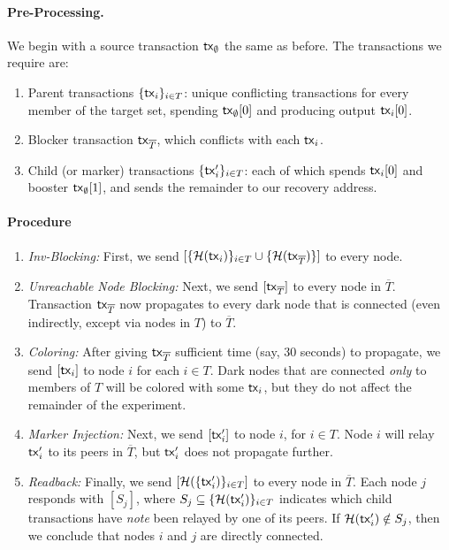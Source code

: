\paragraph{Pre-Processing.}
We begin with a source transaction $\textnormal{\textsf{tx}}_\emptyset$ the same as before. The transactions we require are:
\begin{enumerate}
\item Parent transactions $\{\textnormal{\textsf{tx}}_{i}\}_{i \in T}$: unique conflicting transactions for every member of the target set, spending $\textnormal{\textsf{tx}}_\emptyset[0]$ and producing output $\textnormal{\textsf{tx}}_i[0]$.
\item Blocker transaction $\textnormal{\textsf{tx}}_{\overline{T}}$, which conflicts with each $\textnormal{\textsf{tx}}_{i}$.
\item Child (or marker) transactions $\{\textnormal{\textsf{tx}}'_i\}_{i \in T}$: each of which spends $\textnormal{\textsf{tx}}_i[0]$ and booster $\textnormal{\textsf{tx}}_\emptyset[1]$, and sends the remainder to our recovery address.
\end{enumerate}

\paragraph{Procedure}
\begin{enumerate}
\item \emph{Inv-Blocking:} First, we send $[\{\mathcal{H}(\textnormal{\textsf{tx}}_i)\}_{i \in T} \cup \{\mathcal{H}(\textnormal{\textsf{tx}}_{\overline{T}})\}]$ to every node.
\item \emph{Unreachable Node Blocking:} Next, we send $[\textnormal{\textsf{tx}}_{\overline{T}}]$ to every node in $\overline{T}$. Transaction $\textnormal{\textsf{tx}}_{\overline{T}}$ now propagates to every dark node that is connected (even indirectly, except via nodes in $T$) to $\overline{T}$.
\item \emph{Coloring:} After giving $\textnormal{\textsf{tx}}_{\overline{T}}$ sufficient time (say, 30 seconds) to propagate, we send $[\textnormal{\textsf{tx}}_i]$ to node $i$ for each $i \in T$. Dark nodes that are connected \emph{only} to members of $T$ will be colored with some $\textnormal{\textsf{tx}}_i$, but they do not affect the remainder of the experiment.
\item \emph{Marker Injection:} Next, we send $[\textnormal{\textsf{tx}}'_i]$ to node $i$, for $i \in T$. Node $i$ will relay $\textnormal{\textsf{tx}}'_i$ to its peers in $\overline{T}$, but $\textnormal{\textsf{tx}}'_i$ does not propagate further.
\item \emph{Readback:} Finally, we send $[\mathcal{H}(\{\textnormal{\textsf{tx}}'_i)\}_{i \in T}]$ to every node in $\overline{T}$. Each node $j$ responds with $[S_j]$, where $S_j \subseteq \{\mathcal{H}(\textnormal{\textsf{tx}}'_i)\}_{i\in T}$ indicates which child transactions have \emph{note} been relayed by one of its peers. If $\mathcal{H}(\textnormal{\textsf{tx}}'_i) \notin S_j$, then we conclude that nodes $i$ and $j$ are directly connected.
\end{enumerate}

